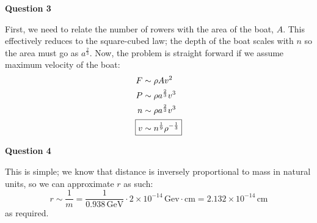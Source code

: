 \documentclass[10pt]{article}
\begin{document}
\textbf{Question 3}

First, we need to relate the number of rowers with the area of the boat, $A$. This effectively reduces to the square-cubed law; the depth of the boat scales with $n$ so the area must go as $a^{\frac{2}{3}}$. Now, the problem is straight forward if we assume maximum velocity of the boat:
\[
\begin{aligned}
  F & \sim \rho Av^{2} \\
  P & \sim \rho a^{\frac{2}{3}}v^{3} \\
  n & \sim \rho a^{\frac{2}{3}}v^{3} \\
  \Aboxed{v & \sim n^{\frac{1}{9}}\rho^{-\frac{1}{3}}}
\end{aligned}
\]

\textbf{Question 4}

This is simple; we know that distance is inversely proportional to mass in natural units, so we can approximate $r$ as such:
\[ r \sim \frac{1}{m} = \frac{1}{0.938\, \text{GeV}}\cdot 2\times10^{-14}\,\text{Gev}\cdot\text{cm} = 2.132\times10^{-14}\,\text{cm} \]
as required.
\end{document}
